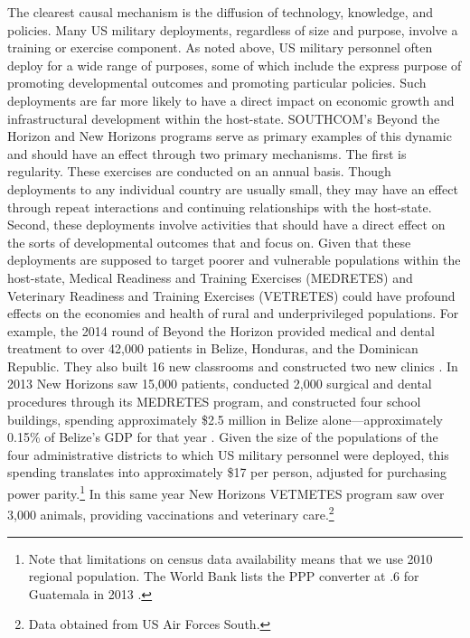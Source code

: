 \documentclass[12pt]{article}
\begin{document}
\begin{doublespace}
The clearest causal mechanism is the diffusion of technology, knowledge, and policies. Many US military deployments, regardless of size and purpose, involve a training or exercise component. As noted above, US military personnel often deploy for a wide range of purposes, some of which include the express purpose of promoting developmental outcomes and promoting particular policies. Such deployments are far more likely to have a direct impact on economic growth and infrastructural development within the host-state. SOUTHCOM's Beyond the Horizon and New Horizons programs serve as primary examples of this dynamic and should have an effect through two primary mechanisms. The first is regularity. These exercises are conducted on an annual basis. Though deployments to any individual country are usually small, they may have an effect through repeat interactions and continuing relationships with the host-state. Second, these deployments involve activities that should have a direct effect on the sorts of developmental outcomes that  and  focus on. Given that these deployments are supposed to target poorer and vulnerable populations within the host-state, Medical Readiness and Training Exercises (MEDRETES) and Veterinary Readiness and Training Exercises (VETRETES) could have profound effects on the economies and health of rural and underprivileged populations. For example, the 2014 round of Beyond the Horizon provided medical and dental treatment to over 42,000 patients in Belize, Honduras, and the Dominican Republic. They also built 16 new classrooms and constructed two new clinics \cite[21]{Kelly2015}. In 2013 New Horizons saw 15,000 patients, conducted 2,000 surgical and dental procedures through its MEDRETES program, and constructed four school buildings, spending approximately \$2.5 million in Belize alone---approximately 0.15\% of Belize's GDP for that year \cite{WDI2015}. Given the size of the populations of the four administrative districts to which US military personnel were deployed, this spending translates into approximately \$17 per person, adjusted for purchasing power parity.\footnote{Note that limitations on census data availability means that we use 2010 regional population. The World Bank lists the PPP converter at .6 for Guatemala in 2013 \cite{WDI2015}.}  In this same year New Horizons VETMETES program saw over 3,000 animals, providing vaccinations and veterinary care.\footnote{Data obtained from US Air Forces South.} 


\end{doublespace}
\end{document}
